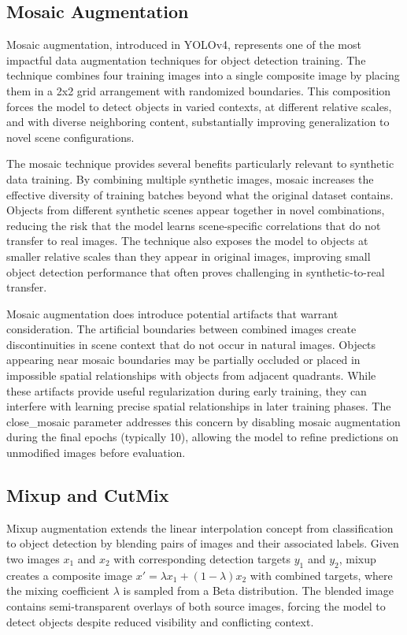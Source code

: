 \subsection{Mosaic Augmentation}

Mosaic augmentation, introduced in YOLOv4, represents one of the most impactful data augmentation techniques for object detection training. The technique combines four training images into a single composite image by placing them in a 2x2 grid arrangement with randomized boundaries. This composition forces the model to detect objects in varied contexts, at different relative scales, and with diverse neighboring content, substantially improving generalization to novel scene configurations.

The mosaic technique provides several benefits particularly relevant to synthetic data training. By combining multiple synthetic images, mosaic increases the effective diversity of training batches beyond what the original dataset contains. Objects from different synthetic scenes appear together in novel combinations, reducing the risk that the model learns scene-specific correlations that do not transfer to real images. The technique also exposes the model to objects at smaller relative scales than they appear in original images, improving small object detection performance that often proves challenging in synthetic-to-real transfer.

Mosaic augmentation does introduce potential artifacts that warrant consideration. The artificial boundaries between combined images create discontinuities in scene context that do not occur in natural images. Objects appearing near mosaic boundaries may be partially occluded or placed in impossible spatial relationships with objects from adjacent quadrants. While these artifacts provide useful regularization during early training, they can interfere with learning precise spatial relationships in later training phases. The close\_mosaic parameter addresses this concern by disabling mosaic augmentation during the final epochs (typically 10), allowing the model to refine predictions on unmodified images before evaluation.

\subsection{Mixup and CutMix}

Mixup augmentation extends the linear interpolation concept from classification to object detection by blending pairs of images and their associated labels. Given two images $x_1$ and $x_2$ with corresponding detection targets $y_1$ and $y_2$, mixup creates a composite image $x' = \lambda x_1 + (1-\lambda) x_2$ with combined targets, where the mixing coefficient $\lambda$ is sampled from a Beta distribution. The blended image contains semi-transparent overlays of both source images, forcing the model to detect objects despite reduced visibility and conflicting context.

